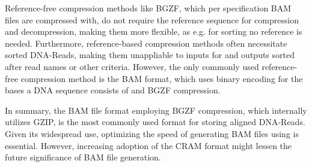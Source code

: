 Reference-free compression methods like BGZF, which per specification BAM files are compressed with, do not require the reference sequence for compression and decompression, making them more flexible, as e.g. for sorting no reference is needed. Furthermore, reference-based compression methods often necessitate sorted DNA-Reads, making them unappliable to inputs for \sort and outputs sorted after read names or other criteria. However, the only commonly used reference-free compression method is the BAM format, which uses binary encoding for the bases a DNA sequence consists of and BGZF compression. 

In summary, the BAM file format employing BGZF compression, which internally utilizes GZIP, is the most commonly used format for storing aligned DNA-Reads. Given its widespread use, optimizing the speed of generating BAM files using \sort is essential. However, increasing adoption of the CRAM format might lessen the future significance of BAM file generation.

